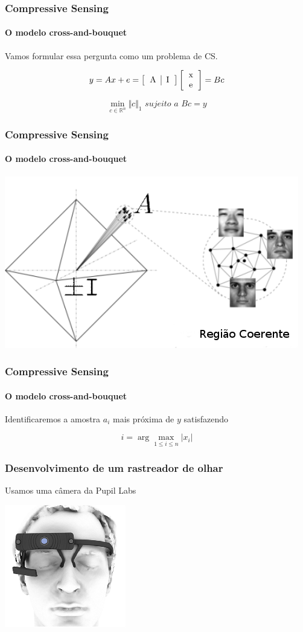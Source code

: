 \documentclass[11pt]{beamer}
\begin{document}
\begin{frame}
\frametitle{Compressive Sensing}
\framesubtitle{O modelo cross-and-bouquet}

Vamos formular essa pergunta como um problema de CS.

$$y = Ax + e = \left[ \begin{tabular}{c | c} A & I \end{tabular} \right] \left[ \begin{tabular}{c} x \\ e \end{tabular}\right] = Bc$$

$$\min_{c \in \mathbb{R}^n} \Vert c \Vert_1 \textit{ sujeito a } Bc = y$$
\end{frame}

\begin{frame}
\frametitle{Compressive Sensing}
\framesubtitle{O modelo cross-and-bouquet}
\centering
\includegraphics[scale=.4]{imagens/cross-and-bouquet.png}
\end{frame}

\begin{frame}
\frametitle{Compressive Sensing}
\framesubtitle{O modelo cross-and-bouquet}
\centering
Identificaremos a amostra $a_i$ mais próxima de $y$ satisfazendo

$$i = \arg \max_{1 \leq i \leq n} \vert x_i \vert$$
\end{frame}

\begin{frame}
\frametitle{Desenvolvimento de um rastreador de olhar}

Usamos uma câmera da Pupil Labs

\vspace{1cm}
\centering
\includegraphics[scale=.6]{imagens/pupil.png}
\end{frame}
\end{document}

